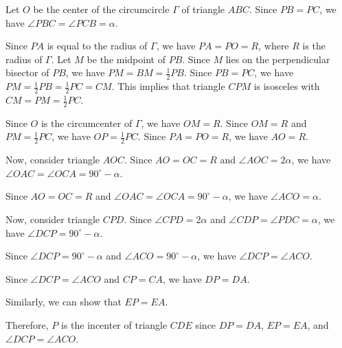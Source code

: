 Let $O$ be the center of the circumcircle $\Gamma$ of triangle $ABC$. Since $PB = PC$, we have $\angle PBC = \angle PCB = \alpha$.

Since $PA$ is equal to the radius of $\Gamma$, we have $PA = PO = R$, where $R$ is the radius of $\Gamma$. Let $M$ be the midpoint of $PB$. Since $M$ lies on the perpendicular bisector of $PB$, we have $PM = BM = \frac{1}{2}PB$. Since $PB = PC$, we have $PM = \frac{1}{2}PB = \frac{1}{2}PC = CM$. This implies that triangle $CPM$ is isosceles with $CM = PM = \frac{1}{2}PC$. 

Since $O$ is the circumcenter of $\Gamma$, we have $OM = R$. Since $OM = R$ and $PM = \frac{1}{2}PC$, we have $OP = \frac{1}{2}PC$. Since $PA = PO = R$, we have $AO = R$. 

Now, consider triangle $AOC$. Since $AO = OC = R$ and $\angle AOC = 2\alpha$, we have $\angle OAC = \angle OCA = 90^{\circ} - \alpha$. 

Since $AO = OC = R$ and $\angle OAC = \angle OCA = 90^{\circ} - \alpha$, we have $\angle ACO = \alpha$. 

Now, consider triangle $CPD$. Since $\angle CPD = 2\alpha$ and $\angle CDP = \angle PDC = \alpha$, we have $\angle DCP = 90^{\circ} - \alpha$. 

Since $\angle DCP = 90^{\circ} - \alpha$ and $\angle ACO = 90^{\circ} - \alpha$, we have $\angle DCP = \angle ACO$. 

Since $\angle DCP = \angle ACO$ and $CP = CA$, we have $DP = DA$. 

Similarly, we can show that $EP = EA$. 

Therefore, $P$ is the incenter of triangle $CDE$ since $DP = DA$, $EP = EA$, and $\angle DCP = \angle ACO$.
